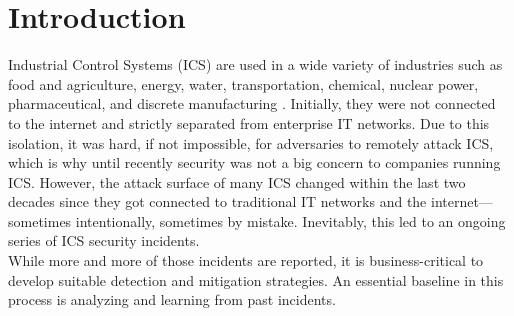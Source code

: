 \documentclass[runningheads]{llncs}
\begin{document}
\section{Introduction}
Industrial Control Systems (ICS) are used in a wide variety of industries such as food and agriculture, energy, water, transportation, chemical, nuclear power, pharmaceutical, and discrete manufacturing \cite{stouffer.2011}.
Initially, they were not connected to the internet and strictly separated from enterprise IT networks.
Due to this isolation, it was hard, if not impossible, for adversaries to remotely attack ICS, which is why until recently security was not a big concern to companies running ICS.
However, the attack surface of many ICS changed within the last two decades since they got connected to traditional IT networks and the internet---sometimes intentionally, sometimes by mistake.
Inevitably, this led to an ongoing series of ICS security incidents.\\
While more and more of those incidents are reported, it is business-critical to develop suitable detection and mitigation strategies.
An essential baseline in this process is analyzing and learning from past incidents.
\end{document}
